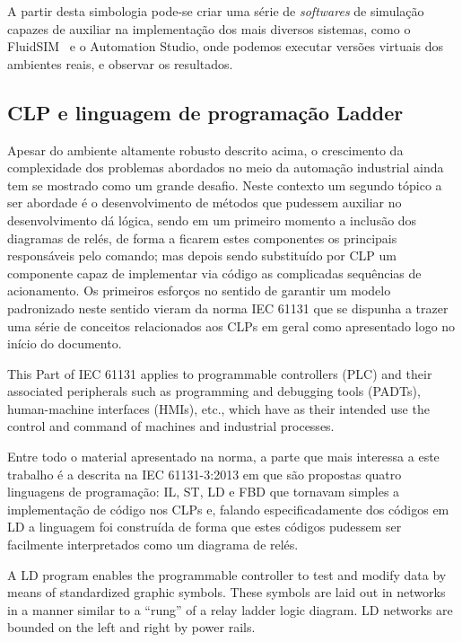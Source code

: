 A partir desta simbologia pode-se criar uma série de \textit{softwares} de simulação capazes de auxiliar na 
implementação dos mais diversos sistemas, como o FluidSIM\textregistered~ e o Automation Studio, onde podemos executar
versões virtuais dos ambientes reais, e observar os resultados. 

\subsection{CLP e linguagem de programação Ladder}

Apesar do ambiente altamente robusto descrito acima, o crescimento da complexidade dos problemas abordados no meio da 
automação industrial ainda tem se mostrado como um grande desafio. Neste contexto um segundo tópico a ser abordade é o
desenvolvimento de métodos que pudessem auxiliar no desenvolvimento dá lógica, sendo em um primeiro momento
a inclusão dos diagramas de relés, de forma a ficarem estes componentes os principais responsáveis pelo comando; 
mas depois sendo substituído por \ac{CLP} um componente capaz de implementar via código as complicadas sequências de acionamento.
Os primeiros esforços no sentido de garantir um modelo padronizado neste sentido vieram da norma IEC 61131 que se dispunha
a trazer uma série de conceitos relacionados aos \ac{CLP}s em geral como apresentado logo no início do documento.

\begin{citacao}
    This Part of IEC 61131 applies to programmable controllers (PLC) and their associated 
    peripherals such as programming and debugging tools (PADTs), human-machine interfaces
    (HMIs), etc., which have as their intended use the control and command of machines and
    industrial processes.\cite{IEC-61131-1:2003}
\end{citacao}    

Entre todo o material apresentado na norma, a parte que mais interessa a este trabalho é a descrita na IEC 61131-3:2013 
em que são propostas quatro linguagens de programação: \ac{IL}, \ac{ST}, \ac{LD} e \ac{FBD} \cite{IEC-61131-3:2013} 
que tornavam simples a implementação de código nos \ac{CLP}s e, falando especificadamente dos códigos em \ac{LD} a 
linguagem foi construída de forma que estes códigos pudessem ser facilmente interpretados como um diagrama de relés.

\begin{citacao}
    A LD program enables the programmable controller to test and modify data by means of standardized
    graphic symbols. These symbols are laid out in networks in a manner similar to a “rung” of a relay
    ladder logic diagram. LD networks are bounded on the left and right by power rails.\cite{IEC-61131-3:2013}
\end{citacao}    

